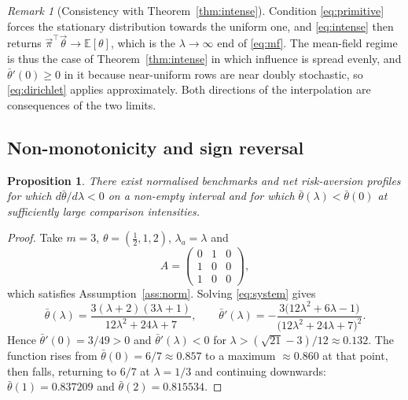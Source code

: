 \documentclass[12pt]{article}
\newtheorem{proposition}{Proposition}
\theoremstyle{definition}
\theoremstyle{remark}
\newtheorem{remark}{Remark}
\newcommand{\E}{\mathbb{E}}
\newcommand{\bth}{\bar\theta}
\begin{document}
\begin{remark}[Consistency with Theorem~\ref{thm:intense}]
\label{rem:consistency}
Condition \eqref{eq:primitive} forces the stationary distribution towards the
uniform one, and \eqref{eq:intense} then returns
$\vec\pi^{\top}\vec\theta\to\E[\theta]$, which is the $\lambda\to\infty$ end of
\eqref{eq:mf}. The mean-field regime is thus the case of
Theorem~\ref{thm:intense} in which influence is spread evenly, and
$\bth'(0)\geq0$ in it because near-uniform rows are near doubly stochastic, so
\eqref{eq:dirichlet} applies approximately. Both directions of the interpolation
are consequences of the two limits.
\end{remark}

\subsection{Non-monotonicity and sign reversal}

\begin{proposition}
\label{prop:reversal}
There exist normalised benchmarks and net risk-aversion profiles for which
$d\bth/d\lambda<0$ on a non-empty interval and for which
$\bth(\lambda)<\bth(0)$ at sufficiently large comparison intensities.
\end{proposition}

\begin{proof}
Take $m=3$, $\theta=(\tfrac12,1,2)$, $\lambda_a=\lambda$ and
%
\begin{equation*}
A=\begin{pmatrix}0&1&0\\1&0&0\\1&0&0\end{pmatrix},
\end{equation*}
%
which satisfies Assumption~\ref{ass:norm}. Solving \eqref{eq:system} gives
%
\begin{equation}
\bth(\lambda)=\frac{3(\lambda+2)(3\lambda+1)}{12\lambda^{2}+24\lambda+7},
\qquad
\bth'(\lambda)=-\frac{3\big(12\lambda^{2}+6\lambda-1\big)}
{\big(12\lambda^{2}+24\lambda+7\big)^{2}} .
\label{eq:cex}
\end{equation}
%
Hence $\bth'(0)=3/49>0$ and $\bth'(\lambda)<0$ for
$\lambda>(\sqrt{21}-3)/12\approx0.132$. The function rises from
$\bth(0)=6/7\approx0.857$ to a maximum $\approx0.860$ at that point, then
falls, returning to $6/7$ at $\lambda=1/3$ and continuing downwards:
$\bth(1)=0.837209$ and $\bth(2)=0.815534$.
\end{proof}
\end{document}
